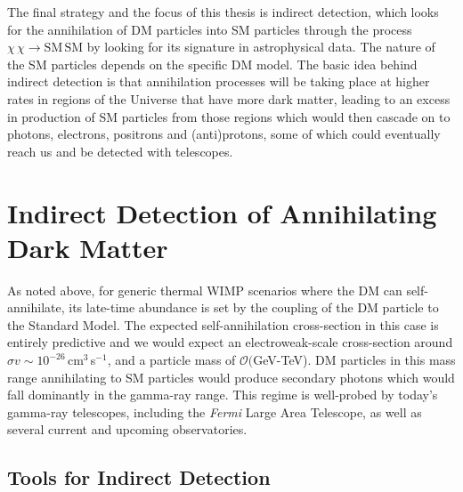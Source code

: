 The final strategy and the focus of this thesis is indirect detection, which looks for the annihilation of DM particles into SM particles through the process $\chi\,\chi\rightarrow\mathrm{SM}\,\mathrm{SM}$ by looking for its signature in astrophysical data. The nature of the SM particles depends on the specific DM model. The basic idea behind indirect detection is that annihilation processes will be taking place at higher rates in regions of the Universe that have more dark matter, leading to an excess in production of SM particles from those regions which would then cascade on to photons, electrons, positrons and (anti)protons, some of which could eventually reach us and be detected with telescopes. %

\section{Indirect Detection of Annihilating Dark Matter}
\label{sec:astrodm}

As noted above, for generic thermal WIMP scenarios where the DM can self-annihilate, its late-time abundance is set by the coupling of the DM particle to the Standard Model. The expected self-annihilation cross-section in this case is entirely predictive and we would expect an electroweak-scale cross-section around $\sigma v\sim 10^{-26}$\,cm$^3$\,s$^{-1}$, and a particle mass of $\mathcal O($GeV-TeV). DM particles in this mass range annihilating to SM particles would produce secondary photons which would fall dominantly in the gamma-ray range. This regime is well-probed by today's gamma-ray telescopes, including the \emph{Fermi} Large Area Telescope, as well as several current and upcoming observatories. %

\subsection{Tools for Indirect Detection}

